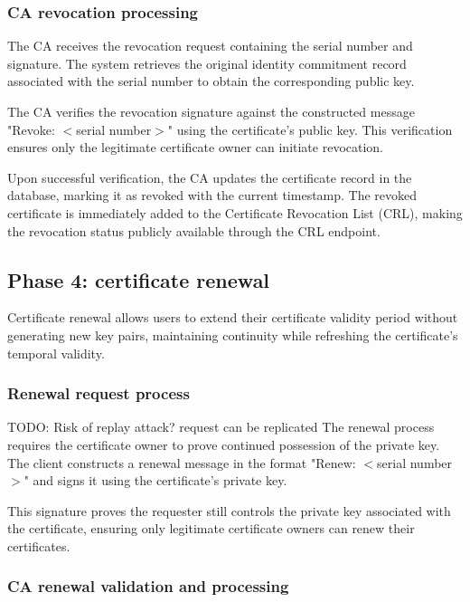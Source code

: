 \subsubsection{CA revocation processing}

The CA receives the revocation request containing the serial number and signature. 
The system retrieves the original identity commitment record associated with 
the serial number to obtain the corresponding public key.

The CA verifies the revocation signature against the constructed message 
"Revoke: $<$serial number$>$" using the certificate's public key. This verification 
ensures only the legitimate certificate owner can initiate revocation.

Upon successful verification, the CA updates the certificate record in the database, 
marking it as revoked with the current timestamp. The revoked certificate is 
immediately added to the Certificate Revocation List (CRL), making the revocation 
status publicly available through the CRL endpoint.

\subsection{Phase 4: certificate renewal}

Certificate renewal allows users to extend their certificate validity period 
without generating new key pairs, maintaining continuity while refreshing 
the certificate's temporal validity.

\subsubsection{Renewal request process}
{\color{red}TODO: Risk of replay attack? request can be replicated}
The renewal process requires the certificate owner to prove continued possession 
of the private key. The client constructs a renewal message in the format 
"Renew: $<$serial number$>$" and signs it using the certificate's private key.

This signature proves the requester still controls the private key associated 
with the certificate, ensuring only legitimate certificate owners can renew 
their certificates.

\subsubsection{CA renewal validation and processing}

